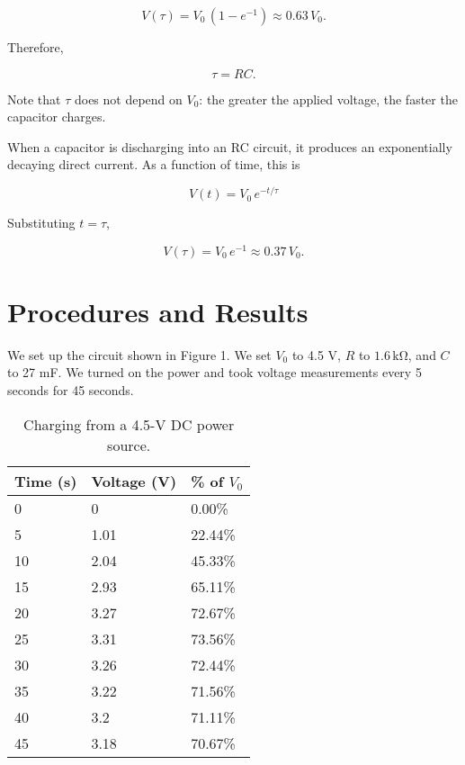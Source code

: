 \documentclass[11pt, titlepage, letterpaper, twoside]{article}
\begin{document}
\begin{equation}
  V(\tau) = V_0\,(1 - e^{-1}) \approx 0.63\,V_0.
\end{equation}

\pagebreak

Therefore,

\begin{equation}
  \tau = RC.
\end{equation}

Note that $\tau$ does not depend on $V_0$: the greater the applied voltage, the faster the capacitor charges.

When a capacitor is discharging into an RC circuit, it produces an exponentially decaying direct current. As a function of time,
this is

\begin{equation}
  V(t) = V_0\, e^{-t/\tau}
\end{equation}

Substituting $t = \tau$,

\begin{equation}
  V(\tau) = V_0\, e^{-1} \approx 0.37\,V_0.
\end{equation}


\section{Procedures and Results}
We set up the circuit shown in Figure 1. We set $V_0$ to 4.5 V, $R$ to $1.6\,\mathrm{k\Omega}$, and $C$ to 27 mF. We turned on
the power and took voltage measurements every 5 seconds for 45 seconds.

\begin{table}[h!]
\centering
\caption{Charging from a 4.5-V DC power source.}
\label{charging-1}
\begin{tabular}{|l|l|l|}
\hline
Time (s) & Voltage (V) & \% of $V_0$ \\ \hline
0        & 0           & 0.00\%     \\ \hline
5        & 1.01        & 22.44\%    \\ \hline
10       & 2.04        & 45.33\%    \\ \hline
15       & 2.93        & 65.11\%    \\ \hline
20       & 3.27        & 72.67\%    \\ \hline
25       & 3.31        & 73.56\%    \\ \hline
30       & 3.26        & 72.44\%    \\ \hline
35       & 3.22        & 71.56\%    \\ \hline
40       & 3.2         & 71.11\%    \\ \hline
45       & 3.18        & 70.67\%    \\ \hline
\end{tabular}
\end{table}
\end{document}
